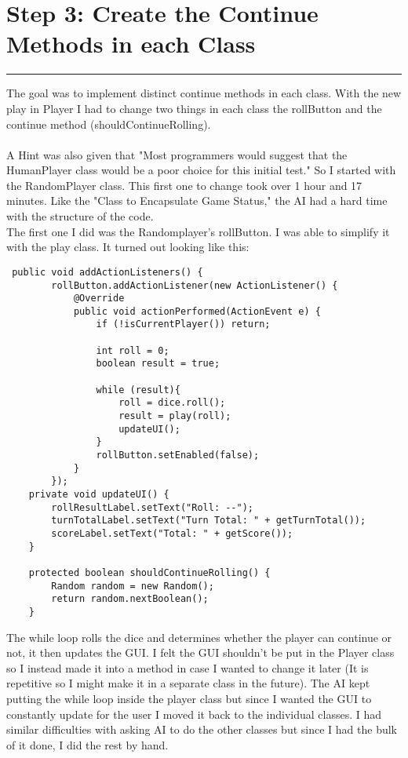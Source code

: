 \documentclass[a4paper,11pt]{article}
\begin{document}
\section*{Step 3: Create the Continue Methods in each Class}
\hrule
\vspace{10pt}
The goal was to implement distinct continue methods in each class. With the new play in Player I had to change two things in each class the rollButton and the continue method (shouldContinueRolling). \\\\
A Hint was also given that "Most programmers would suggest that the HumanPlayer class would be a poor choice for this initial test." So I started with the RandomPlayer class. This first one to change took over 1 hour and 17 minutes. Like the "Class to Encapsulate Game Status," the AI had a hard time with the structure of the code. \\ The first one I did was the Randomplayer's rollButton. I was able to simplify it with the play class. It turned out looking like this:
\begin{lstlisting}
 public void addActionListeners() {
        rollButton.addActionListener(new ActionListener() {
            @Override
            public void actionPerformed(ActionEvent e) {
                if (!isCurrentPlayer()) return;
                
                int roll = 0;
                boolean result = true;
                
                while (result){
                    roll = dice.roll();
                    result = play(roll);
                    updateUI();
                }
                rollButton.setEnabled(false);
            }
        });
    private void updateUI() {
        rollResultLabel.setText("Roll: --"); 
        turnTotalLabel.setText("Turn Total: " + getTurnTotal());
        scoreLabel.setText("Total: " + getScore());
    }
    
    protected boolean shouldContinueRolling() {
        Random random = new Random();
        return random.nextBoolean();
    }
\end{lstlisting}
The while loop rolls the dice and determines whether the player can continue or not, it then updates the GUI. I felt the GUI shouldn't be put in the Player class so I instead made it into a method in case I wanted to change it later (It is repetitive so I might make it in a separate class in the future). The AI kept putting the while loop inside the player class but since I wanted the GUI to constantly update for the user I moved it back to the individual classes. I had similar difficulties with asking AI to do the other classes but since I had the bulk of it done, I did the rest by hand. \\
\end{document}
